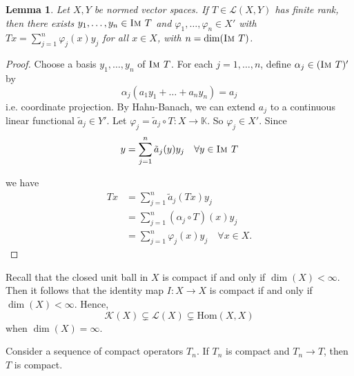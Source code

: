\documentclass[10pt, oneside, reqno]{amsbook}
\theoremstyle{plain}%
\newtheorem{lem}[thm]{Lemma}
\theoremstyle{definition}
\theoremstyle{remark}
\newcommand{\K}{\mathbb{K}}
\renewcommand{\phi}{\varphi}
\newcommand{\im}{\textsc{Im\ }}
\begin{document}
\begin{lem}
    Let $X, Y$ be normed vector spaces.  If $T \in \mathcal L(X,Y)$ has finite rank, then there exists $y_1, \dots, y_n \in \im T$ and $\phi_1, \dots, \phi_n \in X'$ with $Tx = \sum_{j=1}^n \phi_j(x) y_j$ for all $x \in X$, with $n = \dim( \im T)$. 
\end{lem}

\begin{proof}
    Choose a basis $y_1, \dots, y_n$ of $\im T$.  For each $j = 1, \dots, n$, define $\alpha_j \in (\im T)'$ by \[
        \alpha_j(a_1 y_1 + \dots + a_n y_n) = a_j
    \] i.e. coordinate projection.  By Hahn-Banach, we can extend $a_j$ to a continuous linear functional $\tilde a_j \in Y'$.  Let $\phi_j = \tilde a_j \circ T : X \rightarrow \K$.  So $\phi_j \in X'$.  Since \[
         y = \sum_{j=1}^n \tilde a_j(y) y_j \quad \forall y \in \im T
    \] 
    
    we have \begin{align*}
        Tx  &= \sum_{j= 1}^n \tilde a_j (Tx) y_j \\
            &= \sum_{j=1}^n (\alpha_j \circ T)(x) y_j    \\
            &= \sum_{j=1}^n \phi_j(x) y_j \quad \forall x \in X.
    \end{align*}
\end{proof}



Recall that the closed unit ball in $X$ is compact if and only if $\dim(X) < \infty$.  Then it follows that the identity map $I : X \rightarrow X$ is compact if and only if $\dim(X) < \infty$.  Hence, \[
    \mathcal K(X) \subsetneq \mathcal L(X) \subsetneq \text{Hom}(X, X) 
\] when $\dim(X) = \infty$.    

Consider a sequence of compact operators $T_n$.  If $T_n$ is compact and $T_n \rightarrow T$, then $T$ is compact.  
\end{document}
